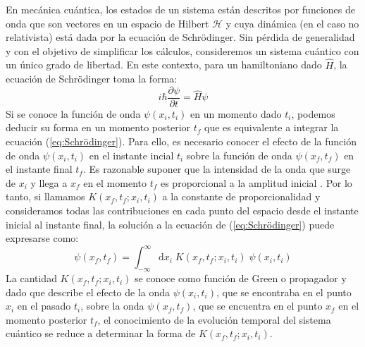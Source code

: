 \documentclass[11pt,a4paper]{article}
\begin{document}
En mec\'anica cu\'antica, los estados de un sistema est\'an descritos por funciones de onda que son vectores en un espacio de Hilbert $\mathcal{H}$ y cuya din\'amica (en el caso no relativista) est\'a dada por la ecuaci\'on de Schrödinger. Sin p\'erdida de generalidad y con el objetivo de simplificar los c\'alculos, consideremos un sistema cu\'antico con un \'unico grado de libertad. En este contexto, para un hamiltoniano dado $\hat{H}$, la ecuaci\'on de Schrödinger toma la forma:
\begin{equation}
i \hbar \frac{\partial \psi}{\partial t} = \hat{H} \psi
\label{eq:Schrödinger}
\end{equation}
Si se conoce la función de onda $\psi(x_i,t_i)$ en un momento dado $t_i$, podemos deducir su forma en un momento posterior $t_f$ que es equivalente a integrar la ecuaci\'on (\ref{eq:Schrödinger}). Para ello, es necesario conocer el efecto de la funci\'on de onda $\psi(x_i,t_i)$ en el instante incial $t_i$ sobre la funci\'on de onda $\psi(x_f,t_f)$ en el instante final $t_f$. Es razonable suponer que la intensidad de la onda que surge de $x_i$ y llega a $x_f$ en el momento $t_f$ es proporcional a la amplitud inicial \cite{greiner2008quantum}. Por lo tanto, si llamamos $K(x_f,t_f;x_i,t_i)$ a la constante de proporcionalidad y consideramos todas las contribuciones en cada punto del espacio desde el instante inicial al instante final, la soluci\'on a la ecuaci\'on de (\ref{eq:Schrödinger}) puede expresarse como:
\begin{equation}
\psi(x_f,t_f)= \int_{-\infty}^{\infty} \mathrm{d}x_i \; K(x_f,t_f; x_i,t_i) \; \psi(x_i,t_i)
\label{eq:Propagator1}
\end{equation}
La cantidad $K(x_f,t_f; x_i,t_i)$ se conoce como función de Green o propagador y dado que describe el efecto de la onda $\psi(x_i,t_i)$, que se encontraba en el punto $x_i$ en el pasado $t_i$, sobre la onda $\psi(x_f,t_f)$, que se encuentra en el punto $x_f$ en el momento posterior $t_f$, el conocimiento de la evoluci\'on temporal del sistema cu\'antico se reduce a determinar la forma de $K(x_f,t_f; x_i,t_i)$.\\
\end{document}
